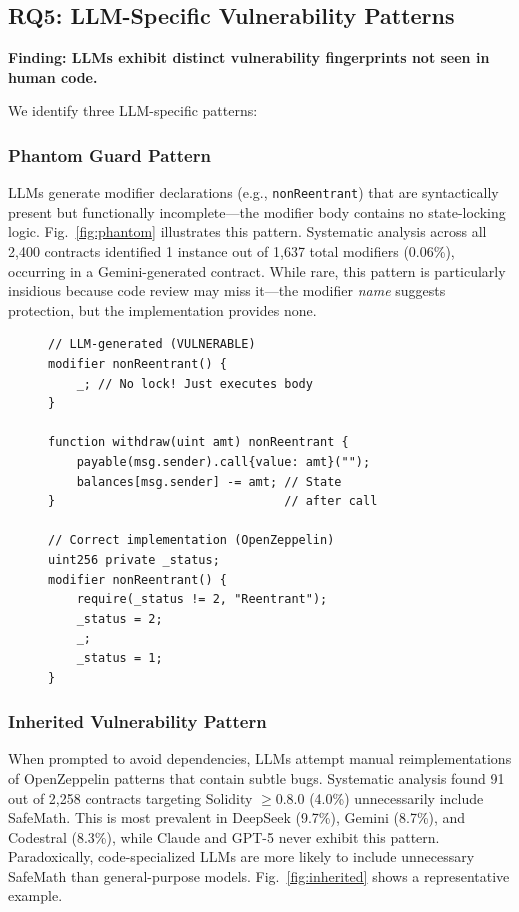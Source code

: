 \subsection{RQ5: LLM-Specific Vulnerability Patterns}

\textbf{Finding: LLMs exhibit distinct vulnerability fingerprints not seen in human code.}

We identify three LLM-specific patterns:

\subsubsection{Phantom Guard Pattern}
LLMs generate modifier declarations (e.g., \texttt{nonReentrant}) that are syntactically present but functionally incomplete---the modifier body contains no state-locking logic. Fig.~\ref{fig:phantom} illustrates this pattern. Systematic analysis across all 2,400 contracts identified 1 instance out of 1,637 total modifiers (0.06\%), occurring in a Gemini-generated contract. While rare, this pattern is particularly insidious because code review may miss it---the modifier \emph{name} suggests protection, but the implementation provides none.

\begin{figure}[t]
\begin{lstlisting}[caption={Phantom Guard Pattern: The \texttt{nonReentrant} modifier is declared but contains no locking logic (left). A correct implementation requires a state variable and checks (right).}, label={fig:phantom}, language=Solidity, basicstyle=\scriptsize\ttfamily]
// LLM-generated (VULNERABLE)
modifier nonReentrant() {
    _; // No lock! Just executes body
}

function withdraw(uint amt) nonReentrant {
    payable(msg.sender).call{value: amt}("");
    balances[msg.sender] -= amt; // State
}                                // after call

// Correct implementation (OpenZeppelin)
uint256 private _status;
modifier nonReentrant() {
    require(_status != 2, "Reentrant");
    _status = 2;
    _;
    _status = 1;
}
\end{lstlisting}
\end{figure}

\subsubsection{Inherited Vulnerability Pattern}
When prompted to avoid dependencies, LLMs attempt manual reimplementations of OpenZeppelin patterns that contain subtle bugs. Systematic analysis found 91 out of 2,258 contracts targeting Solidity $\geq$0.8.0 (4.0\%) unnecessarily include SafeMath. This is most prevalent in DeepSeek (9.7\%), Gemini (8.7\%), and Codestral (8.3\%), while Claude and GPT-5 never exhibit this pattern. Paradoxically, code-specialized LLMs are more likely to include unnecessary SafeMath than general-purpose models. Fig.~\ref{fig:inherited} shows a representative example.


